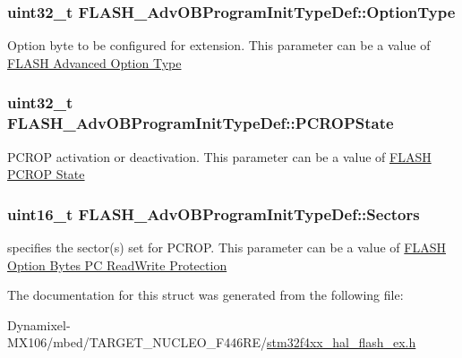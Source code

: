 \subsubsection[{\texorpdfstring{Option\+Type}{OptionType}}]{\setlength{\rightskip}{0pt plus 5cm}uint32\+\_\+t F\+L\+A\+S\+H\+\_\+\+Adv\+O\+B\+Program\+Init\+Type\+Def\+::\+Option\+Type}\hypertarget{struct_f_l_a_s_h___adv_o_b_program_init_type_def_addc57691b6721cfa8b62092e72e9b775}{}\label{struct_f_l_a_s_h___adv_o_b_program_init_type_def_addc57691b6721cfa8b62092e72e9b775}
Option byte to be configured for extension. This parameter can be a value of \hyperlink{group___f_l_a_s_h_ex___advanced___option___type}{F\+L\+A\+SH Advanced Option Type} 
\subsubsection[{\texorpdfstring{P\+C\+R\+O\+P\+State}{PCROPState}}]{\setlength{\rightskip}{0pt plus 5cm}uint32\+\_\+t F\+L\+A\+S\+H\+\_\+\+Adv\+O\+B\+Program\+Init\+Type\+Def\+::\+P\+C\+R\+O\+P\+State}\hypertarget{struct_f_l_a_s_h___adv_o_b_program_init_type_def_ac673a803fde49ba1fdd2c04110a46be2}{}\label{struct_f_l_a_s_h___adv_o_b_program_init_type_def_ac673a803fde49ba1fdd2c04110a46be2}
P\+C\+R\+OP activation or deactivation. This parameter can be a value of \hyperlink{group___f_l_a_s_h_ex___p_c_r_o_p___state}{F\+L\+A\+SH P\+C\+R\+OP State} 
\subsubsection[{\texorpdfstring{Sectors}{Sectors}}]{\setlength{\rightskip}{0pt plus 5cm}uint16\+\_\+t F\+L\+A\+S\+H\+\_\+\+Adv\+O\+B\+Program\+Init\+Type\+Def\+::\+Sectors}\hypertarget{struct_f_l_a_s_h___adv_o_b_program_init_type_def_a4b5fc72d81e2edbf413df808a3c3d68c}{}\label{struct_f_l_a_s_h___adv_o_b_program_init_type_def_a4b5fc72d81e2edbf413df808a3c3d68c}
specifies the sector(s) set for P\+C\+R\+OP. This parameter can be a value of \hyperlink{group___f_l_a_s_h_ex___option___bytes___p_c___read_write___protection}{F\+L\+A\+SH Option Bytes PC Read\+Write Protection} 

The documentation for this struct was generated from the following file\+:\begin{DoxyCompactItemize}
\item 
Dynamixel-\/\+M\+X106/mbed/\+T\+A\+R\+G\+E\+T\+\_\+\+N\+U\+C\+L\+E\+O\+\_\+\+F446\+R\+E/\hyperlink{stm32f4xx__hal__flash__ex_8h}{stm32f4xx\+\_\+hal\+\_\+flash\+\_\+ex.\+h}\end{DoxyCompactItemize}
